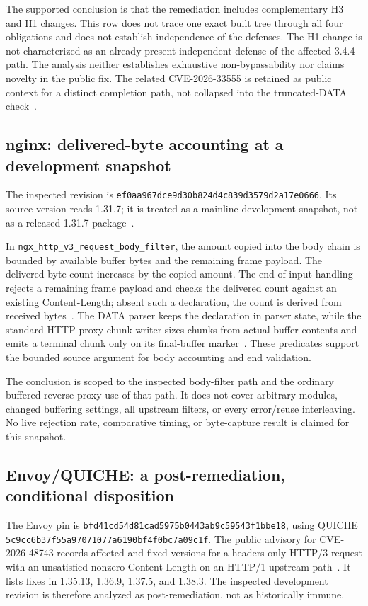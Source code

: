 \documentclass[11pt,letterpaper]{article}
\newcommand{\code}[1]{\nolinkurl{#1}}
\begin{document}
The supported conclusion is that the remediation includes complementary H3 and H1 changes. This row does not trace one exact built tree through all four obligations and does not establish independence of the defenses. The H1 change is not characterized as an already-present independent defense of the affected 3.4.4 path. The analysis neither establishes exhaustive non-bypassability nor claims novelty in the public fix. The related CVE-2026-33555 is retained as public context for a distinct completion path, not collapsed into the truncated-DATA check~\cite{hap33555}.

\subsection{nginx: delivered-byte accounting at a development snapshot}
The inspected revision is \code{ef0aa967dce9d30b824d4c839d3579d2a17e0666}. Its source version reads 1.31.7; it is treated as a mainline development snapshot, not as a released 1.31.7 package~\cite{nginxpin}.

In \code{ngx_http_v3_request_body_filter}, the amount copied into the body chain is bounded by available buffer bytes and the remaining frame payload. The delivered-byte count increases by the copied amount. The end-of-input handling rejects a remaining frame payload and checks the delivered count against an existing Content-Length; absent such a declaration, the count is derived from received bytes~\cite{nginxbody}. The DATA parser keeps the declaration in parser state, while the standard HTTP proxy chunk writer sizes chunks from actual buffer contents and emits a terminal chunk only on its final-buffer marker~\cite{nginxparse,nginxwriter}. These predicates support the bounded source argument for body accounting and end validation.

The conclusion is scoped to the inspected body-filter path and the ordinary buffered reverse-proxy use of that path. It does not cover arbitrary modules, changed buffering settings, all upstream filters, or every error/reuse interleaving. No live rejection rate, comparative timing, or byte-capture result is claimed for this snapshot.

\subsection{Envoy/QUICHE: a post-remediation, conditional disposition}
The Envoy pin is \code{bfd41cd54d81cad5975b0443ab9c59543f1bbe18}, using QUICHE \code{5c9cc6b37f55a97071077a6190bf4f0bc7a09c1f}. The public advisory for CVE-2026-48743 records affected and fixed versions for a headers-only HTTP/3 request with an unsatisfied nonzero Content-Length on an HTTP/1 upstream path~\cite{envoyadvisory}. It lists fixes in 1.35.13, 1.36.9, 1.37.5, and 1.38.3. The inspected development revision is therefore analyzed as post-remediation, not as historically immune.
\end{document}
